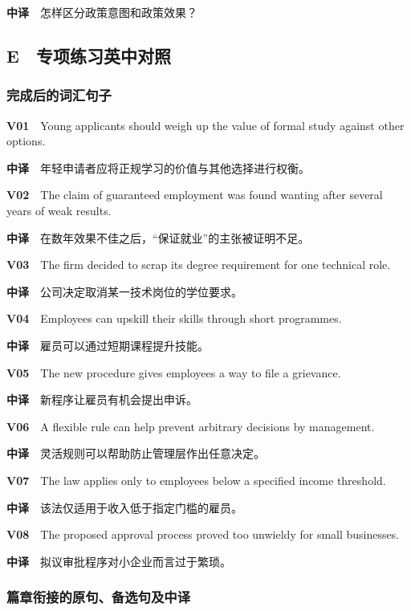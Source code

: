 \documentclass[
  11pt,
]{ctexart}
\begin{document}
\textbf{中译}　怎样区分政策意图和政策效果？

\subsection{E　专项练习英中对照}\label{e-ux4e13ux9879ux7ec3ux4e60ux82f1ux4e2dux5bf9ux7167}

\subsubsection{完成后的词汇句子}\label{ux5b8cux6210ux540eux7684ux8bcdux6c47ux53e5ux5b50}

\textbf{V01}　Young applicants should weigh up the value of formal study
against other options.

\textbf{中译}　年轻申请者应将正规学习的价值与其他选择进行权衡。

\textbf{V02}　The claim of guaranteed employment was found wanting after
several years of weak results.

\textbf{中译}　在数年效果不佳之后，``保证就业''的主张被证明不足。

\textbf{V03}　The firm decided to scrap its degree requirement for one
technical role.

\textbf{中译}　公司决定取消某一技术岗位的学位要求。

\textbf{V04}　Employees can upskill their skills through short
programmes.

\textbf{中译}　雇员可以通过短期课程提升技能。

\textbf{V05}　The new procedure gives employees a way to file a
grievance.

\textbf{中译}　新程序让雇员有机会提出申诉。

\textbf{V06}　A flexible rule can help prevent arbitrary decisions by
management.

\textbf{中译}　灵活规则可以帮助防止管理层作出任意决定。

\textbf{V07}　The law applies only to employees below a specified income
threshold.

\textbf{中译}　该法仅适用于收入低于指定门槛的雇员。

\textbf{V08}　The proposed approval process proved too unwieldy for
small businesses.

\textbf{中译}　拟议审批程序对小企业而言过于繁琐。

\subsubsection{篇章衔接的原句、备选句及中译}\label{ux7bc7ux7ae0ux8854ux63a5ux7684ux539fux53e5ux5907ux9009ux53e5ux53caux4e2dux8bd1}
\end{document}
